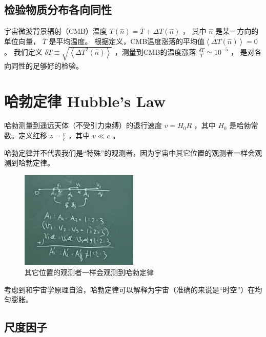 \documentclass[]{ctexart}
\begin{document}
\subsection{检验物质分布各向同性}

宇宙微波背景辐射（CMB）温度 $T (\hat{n}) = \bar{T} + \Delta T (\hat{n})$ ， 其中 $\hat{n}$ 是某一方向的单位向量， $\bar{T}$ 是平均温度。
根据定义，CMB温度涨落的平均值$\left\langle \Delta T (\hat{n}) \right\rangle = 0$ 。
我们定义 $\delta T \equiv \sqrt{\left\langle \Delta T^2 (\hat{n}) \right\rangle}$  ，测量到CMB的温度涨落 $\frac{\delta T}{T} \simeq 10^{-5}$ ，
是对各向同性的足够好的检验。

\section{哈勃定律 Hubble's Law}

哈勃测量到遥远天体（不受引力束缚）的退行速度 $v=H_0 R$ ，其中 $H_0$ 是哈勃常数。定义红移 $z=\frac{v}{c}$ ，其中 $v \ll c$ 。 

哈勃定律并不代表我们是“特殊”的观测者，因为宇宙中其它位置的观测者一样会观测到哈勃定律。
\begin{figure}[!hbtp]
    \centering
    \includegraphics[width=0.5\textwidth]{figures/Hubble.jpg}
    \caption{其它位置的观测者一样会观测到哈勃定律}
\end{figure}


考虑到和宇宙学原理自洽，哈勃定律可以解释为宇宙（准确的来说是“时空”）在均匀膨胀。

\subsection{尺度因子}
\end{document}
